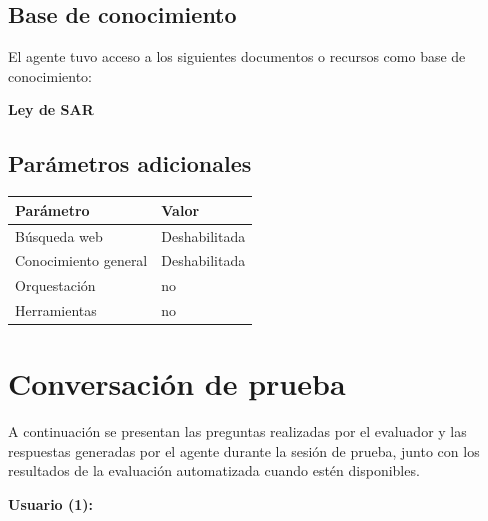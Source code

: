 \documentclass[11pt, a4paper]{article}
\begin{document}
\subsection{Base de conocimiento}

El agente tuvo acceso a los siguientes documentos o recursos como base de
conocimiento:

\vspace{0.3em}
\quad \textbf{Ley de SAR}

\subsection{Parámetros adicionales}

\renewcommand{\arraystretch}{1.35}
\begin{center}
\begin{tabularx}{0.85\textwidth}{l X}
\toprule
\textcolor{profublue}{\textbf{Parámetro}} &
\textcolor{profublue}{\textbf{Valor}} \\
\midrule
Búsqueda web       & Deshabilitada \\
Conocimiento general & Deshabilitada \\
Orquestación        & no \\
Herramientas        & no \\
\bottomrule
\end{tabularx}
\end{center}

\newpage
\section{Conversación de prueba}

A continuación se presentan las preguntas realizadas por el evaluador y las
respuestas generadas por el agente durante la sesión de prueba, junto con
los resultados de la evaluación automatizada cuando estén disponibles.


\noindent
\begin{minipage}{\textwidth}
\textcolor{profublue}{\textbf{Usuario (1):}}\\[4pt]
\end{minipage}
\end{document}
